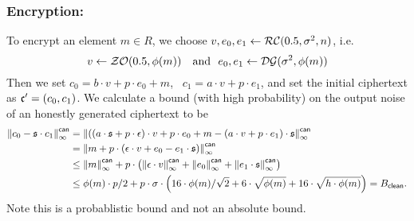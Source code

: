 \subsubsection{Encryption:}
To encrypt an element $m\in R$, we choose $v, e_0, e_1 \leftarrow \mathcal{RC}(0.5,\sigma^2,n)$, i.e.
\[
v \leftarrow \mathcal{ZO}(0.5, \phi(m)) ~~~\mbox{and}~~ e_0,e_1 \leftarrow \mathcal{DG}(\sigma^2,\phi(m)) 
\]
Then we set $c_0 = b \cdot v + p \cdot e_0+m$,~ $c_1=a\cdot v+p\cdot
e_1$, and set the initial ciphertext as $\mathfrak{c}'=(c_0,c_1)$.
We calculate a bound (with high probability) on the output noise of
an honestly generated ciphertext to be
\begin{align*}
  {\Vert c_0 - \mathfrak{s}\cdot c_1 \Vert}_\infty^{\mathsf{can}} 
     &= {\Vert ((a \cdot \mathfrak{s}+ p \cdot \epsilon) \cdot v +p \cdot e_0 +m
                - (a \cdot v+ p \cdot e_1) \cdot \mathfrak{s}  \Vert}_\infty^{\mathsf{can}} \\
     &= {\Vert m + p \cdot (\epsilon \cdot v +e_0 - e_1 \cdot \mathfrak{s}) \Vert}_\infty^{\mathsf{can}} \\
     &\le {\Vert m \Vert}_\infty^{\mathsf{can}} 
         +p \cdot \left( {\Vert \epsilon\cdot v \Vert}_\infty^{\mathsf{can}}
                       + {\Vert e_0 \Vert}_\infty^{\mathsf{can}}
                       + {\Vert e_1 \cdot \mathfrak{s} \Vert}_\infty^{\mathsf{can}}
                  \right) \\
     &\le \phi(m) \cdot p/2
	  + p \cdot \sigma \cdot 
             \left( 16 \cdot \phi(m) / \sqrt{2}
			  + 6 \cdot \sqrt{\phi(m)}
			  +16 \cdot \sqrt{h \cdot \phi(m)}
		    \right) = B_{\mathsf{clean}}.
\end{align*}
Note this is a probablistic bound and not an absolute bound.

\vspace{5mm}

